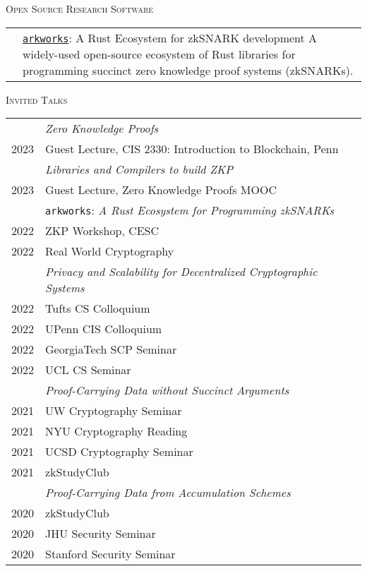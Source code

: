 \documentclass[11pt]{article}
\newenvironment{SectionTable}[1]{
	\renewcommand*{\arraystretch}{1.7}
	\setlength{\tabcolsep}{6pt}
  {\Large \textsc{#1}}
	\begin{longtable}{Rp{5.4in}}}
{\end{longtable}\vspace{-0.2cm}}
\newenvironment{SectionTableSingleSpace}[1]{
	\renewcommand*{\arraystretch}{1.2}
	\setlength{\tabcolsep}{6pt}
  {\Large \textsc{#1}}
	\begin{longtable}{Rp{5.4in}}}
{\end{longtable}\vspace{-0.2cm}}
\begin{document}
\begin{cv}{\vspace{-5em}}
  \begin{SectionTable}{Open Source Research Software}
    & 
    \href{https://github.com/arkworks-rs}{\texttt{arkworks}}: A Rust Ecosystem for zkSNARK development \newline
    A widely-used open-source ecosystem of Rust libraries for programming succinct zero knowledge proof systems (zkSNARKs).
  \end{SectionTable}
  
  \begin{SectionTableSingleSpace}{Invited Talks}
    & \emph{Zero Knowledge Proofs} \\
    2023 & Guest Lecture, CIS 2330: Introduction to Blockchain, Penn\\[0.4em]
    
    & \emph{Libraries and Compilers to build ZKP}\\
    2023 & Guest Lecture, Zero Knowledge Proofs MOOC\\[0.4em]

    & \texttt{arkworks}: \emph{A Rust Ecosystem for Programming zkSNARKs} \\
    2022 & ZKP Workshop, CESC \\
    2022 & Real World Cryptography \\[0.4em]

    & \emph{Privacy and Scalability for Decentralized Cryptographic Systems}\\
    2022 & Tufts CS Colloquium\\
    2022 & UPenn CIS Colloquium\\
    2022 & GeorgiaTech SCP Seminar\\
    2022 & UCL CS Seminar\\[0.4em]

    & \emph{Proof-Carrying Data without Succinct Arguments} \\
    2021 & UW Cryptography Seminar\\
    2021 & NYU Cryptography Reading\\
    2021 & UCSD Cryptography Seminar\\
    2021 & zkStudyClub\\[0.4em]
    
    
    & \emph{Proof-Carrying Data from Accumulation Schemes} \\
    2020 &  zkStudyClub \\
    2020 &  JHU Security Seminar \\
    2020 &  Stanford Security Seminar \\[0.4em]
    

\end{SectionTableSingleSpace}
\end{cv}
\end{document}
